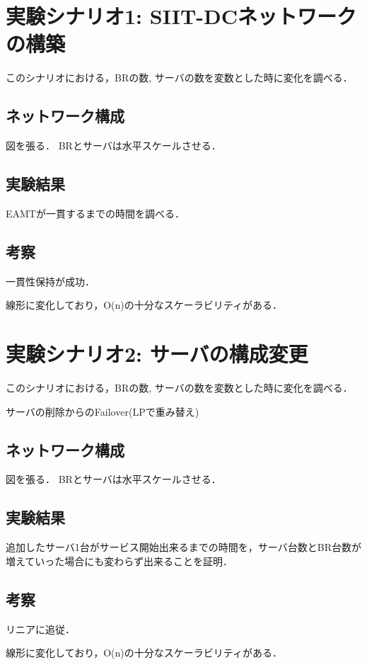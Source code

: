 \section{実験シナリオ1: SIIT-DCネットワークの構築}
このシナリオにおける，BRの数, サーバの数を変数とした時に変化を調べる．

\subsection{ネットワーク構成}
図を張る． BRとサーバは水平スケールさせる．


\subsection{実験結果}
EAMTが一貫するまでの時間を調べる．

\subsection{考察}
一貫性保持が成功．

線形に変化しており，O(n)の十分なスケーラビリティがある．


\section{実験シナリオ2: サーバの構成変更}
このシナリオにおける，BRの数, サーバの数を変数とした時に変化を調べる．

サーバの削除からのFailover(LPで重み替え)



\subsection{ネットワーク構成}
図を張る． BRとサーバは水平スケールさせる．

\subsection{実験結果}
追加したサーバ1台がサービス開始出来るまでの時間を，サーバ台数とBR台数が増えていった場合にも変わらず出来ることを証明．


\subsection{考察}
リニアに追従．

線形に変化しており，O(n)の十分なスケーラビリティがある．


